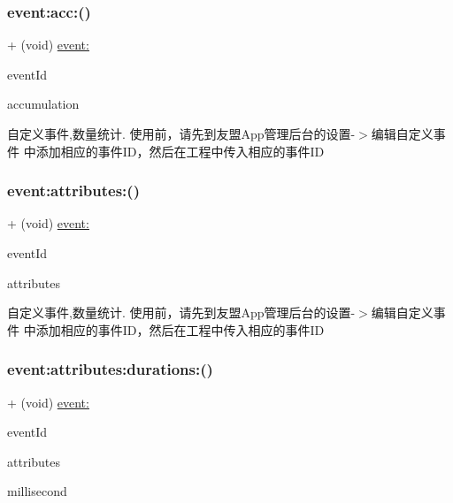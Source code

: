 \subsubsection{\texorpdfstring{event\+:acc\+:()}{event:acc:()}}
{\footnotesize\ttfamily + (void) \hyperlink{interfaceMobClick_a1e1c48199935a97e0d96562627821641}{event\+:} \begin{DoxyParamCaption}\item[{(N\+S\+String $\ast$)}]{event\+Id }\item[{acc:(N\+S\+Integer)}]{accumulation }\end{DoxyParamCaption}}

自定义事件,数量统计. 使用前，请先到友盟\+App管理后台的设置-\/$>$编辑自定义事件 中添加相应的事件\+I\+D，然后在工程中传入相应的事件\+ID \mbox{\label{interfaceMobClick_acd198f68df6e9d7030081dfe302348c7}} 
\subsubsection{\texorpdfstring{event\+:attributes\+:()}{event:attributes:()}}
{\footnotesize\ttfamily + (void) \hyperlink{interfaceMobClick_a1e1c48199935a97e0d96562627821641}{event\+:} \begin{DoxyParamCaption}\item[{(N\+S\+String $\ast$)}]{event\+Id }\item[{attributes:(N\+S\+Dictionary $\ast$)}]{attributes }\end{DoxyParamCaption}}

自定义事件,数量统计. 使用前，请先到友盟\+App管理后台的设置-\/$>$编辑自定义事件 中添加相应的事件\+I\+D，然后在工程中传入相应的事件\+ID \mbox{\label{interfaceMobClick_a059825fd394ee24bb0e6713e5314de7f}} 
\subsubsection{\texorpdfstring{event\+:attributes\+:durations\+:()}{event:attributes:durations:()}}
{\footnotesize\ttfamily + (void) \hyperlink{interfaceMobClick_a1e1c48199935a97e0d96562627821641}{event\+:} \begin{DoxyParamCaption}\item[{(N\+S\+String $\ast$)}]{event\+Id }\item[{attributes:(N\+S\+Dictionary $\ast$)}]{attributes }\item[{durations:(int)}]{millisecond }\end{DoxyParamCaption}}

